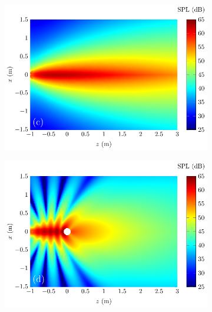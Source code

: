 \begin{figure}[!htb]
\begin{subfigure}{0.49\textwidth}
    \end{subfigure}
    \\
    \begin{subfigure}{0.49\textwidth}
        \centering
        \includegraphics[width = \textwidth]{fig/PalNoSphere_2D_211211E_1000Hz_211211G}
    \end{subfigure}
    \begin{subfigure}{0.49\textwidth}
        \centering
        \includegraphics[width = \textwidth]{fig/PalSphere_211205D_Test2D_Kuznetsov_1000Hz_211211J}
    \end{subfigure}

\end{figure}

